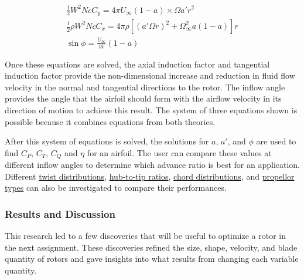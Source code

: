 \documentclass{article}
\begin{document}
\begin{equation}
\begin{aligned}
	\frac{1}{2} W^{2} N c C_{y} = 4 \pi U_{\infty} (1 - a) \times \Omega a' r^{2} \\
	\frac{1}{2} \rho W^{2} N c C_{x} = 4 \pi \rho [(a' \Omega r)^{2} + \Omega^{2}_{\infty} a (1 - a)] r \\
	\sin \phi = \frac{U_{\infty}}{W} (1 - a)
\end{aligned}
\end{equation}

Once these equations are solved, the axial induction factor and tangential induction factor provide the non-dimensional increase and reduction in fluid flow velocity in the normal and tangential directions to the rotor. The inflow angle provides the angle that the airfoil should form with the airflow velocity in its direction of motion to achieve this result. The system of three equations shown is possible because it combines equations from both theories. \newline

After this system of equations is solved, the solutions for $a$, $a'$, and $\phi$ are used to find $C_{P}$, $C_{T}$, $C_{Q}$ and $\eta$ for an airfoil. The user can compare these values at different inflow angles to determine which advance ratio is best for an application. Different \hyperlink{T}{twist distributions}, \hyperlink{D/D}{hub-to-tip ratios}, \hyperlink{c}{chord distributions}, and \hyperlink{APC}{propellor types} can also be investigated to compare their performances. \newline

\subsubsection*{Results and Discussion}

This research led to a few discoveries that will be useful to optimize a rotor in the next assignment. These discoveries refined the size, shape, velocity, and blade quantity of rotors and gave insights into what results from changing each variable quantity. \newline
\end{document}
